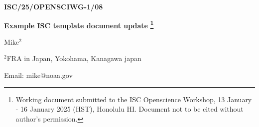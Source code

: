 \thispagestyle{empty}
\begin{flushright}
    \textbf{ISC/25/OPENSCIWG-1/08}
\end{flushright}
\vspace{1in}

\begin{center}
    \textbf{Example ISC template document update}
    \textbf{\footnote{Working document submitted to the ISC Openscience Workshop, 13 January - 16 January 2025
    (HST), Honolulu HI. Document not to be cited without author’s permission.}}
    
    \vspace{0.25in}
    Mike\begin{math}^2\end{math} %

    \vspace{0.25in}
    \begin{math}^2\end{math}FRA in Japan, Yokohama, Kanagawa japan

    \vspace{0.25in}
    Email: mike@noaa.gov
\end{center}

\begin{figure}[!hb]
    \begin{center}
    \end{center}
\end{figure}

\clearpage
